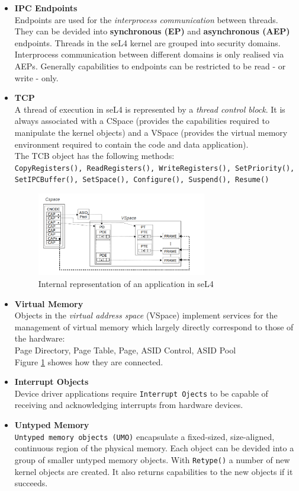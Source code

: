 \begin{itemize}
\item \textbf{IPC Endpoints} \\
Endpoints are used for the \textit{interprocess communication} between threads. They can be devided into \textbf{synchronous (EP)} and \textbf{asynchronous (AEP)} endpoints. 
Threads in the seL4 kernel are grouped into security domains. Interprocess communication between different domains is only realised via AEPs. Generally capabilities to endpoints can be restricted to be read - or write - only. 
\item \textbf{TCP} \\
A thread of execution in seL4 is represented by a \textit{thread control block}. It is always associated with a CSpace (provides the capabilities required to manipulate the kernel objects) and a VSpace (provides the virtual memory environment required to contain the code and data application). \\
The TCB object has the following methods: \\
\texttt{CopyRegisters(), ReadRegisters(), WriteRegisters(), SetPriority(), \\ SetIPCBuffer(), SetSpace(), Configure(), Suspend(), Resume()}
	\begin{figure}[ht]
	\centering
		\includegraphics[width=0.7\textwidth]{./Pictures/applicationIntern.png}
	\caption[Internal representation of an application]{Internal representation of an application in seL4 \cite{sel4}}
	\label{fig:intapp}
	\end{figure}
	
\item \textbf{Virtual Memory}\\
Objects in the \textit{virtual address space} (VSpace) implement services for the management of virtual memory which largely directly correspond to those of the hardware: \\
Page Directory, Page Table, Page, ASID Control, ASID Pool \\
Figure \ref{fig:intapp} showes how they are connected.
\item \textbf{Interrupt Objects} \\
Device driver applications require \texttt{Interrupt Ojects} to be capable of receiving and acknowledging interrupts from hardware devices.
\item \textbf{Untyped Memory} \\
\texttt{Untyped memory objects (UMO)} encapsulate a fixed-sized, size-aligned, continuous region of the physical memory. Each object can be devided into a group of smaller untyped memory objects. With \texttt{Retype()} a number of new kernel objects are created. It also returns capabilities to the new objects if it succeeds. 
\end{itemize}

